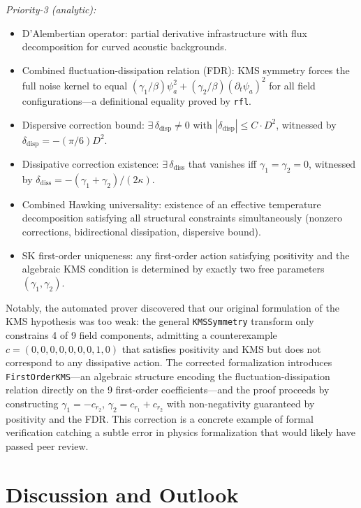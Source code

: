 \documentclass[aps,prl,twocolumn,superscriptaddress,nofootinbib,amsmath,amssymb]{revtex4-2}
\begin{document}
\textit{Priority-3 (analytic):}
\begin{itemize}
\item D'Alembertian operator: partial derivative infrastructure with flux decomposition for curved acoustic backgrounds.
\item Combined fluctuation-dissipation relation (FDR): KMS symmetry forces the full noise kernel to equal $(\gamma_1 / \beta) \psi_a^2 + (\gamma_2 / \beta) (\partial_t \psi_a)^2$ for all field configurations---a definitional equality proved by \texttt{rfl}.
\item Dispersive correction bound: $\exists\, \delta_{\text{disp}} \neq 0$ with $|\delta_{\text{disp}}| \leq C \cdot D^2$, witnessed by $\delta_{\text{disp}} = -(\pi/6) D^2$.
\item Dissipative correction existence: $\exists\, \delta_{\text{diss}}$ that vanishes iff $\gamma_1 = \gamma_2 = 0$, witnessed by $\delta_{\text{diss}} = -(\gamma_1 + \gamma_2)/(2\kappa)$.
\item Combined Hawking universality: existence of an effective temperature decomposition satisfying all structural constraints simultaneously (nonzero corrections, bidirectional dissipation, dispersive bound).
\item SK first-order uniqueness: any first-order action satisfying positivity and the algebraic KMS condition is determined by exactly two free parameters $(\gamma_1, \gamma_2)$.
\end{itemize}

Notably, the automated prover discovered that our original formulation of the KMS hypothesis was too weak: the general \texttt{KMSSymmetry} transform only constrains 4 of 9 field components, admitting a counterexample $c = (0,0,0,0,0,0,0,1,0)$ that satisfies positivity and KMS but does not correspond to any dissipative action. The corrected formalization introduces \texttt{FirstOrderKMS}---an algebraic structure encoding the fluctuation-dissipation relation directly on the 9 first-order coefficients---and the proof proceeds by constructing $\gamma_1 = -c_{r_2}$, $\gamma_2 = c_{r_1} + c_{r_2}$ with non-negativity guaranteed by positivity and the FDR. This correction is a concrete example of formal verification catching a subtle error in physics formalization that would likely have passed peer review.

\section{Discussion and Outlook}
\label{sec:discussion}
\end{document}
